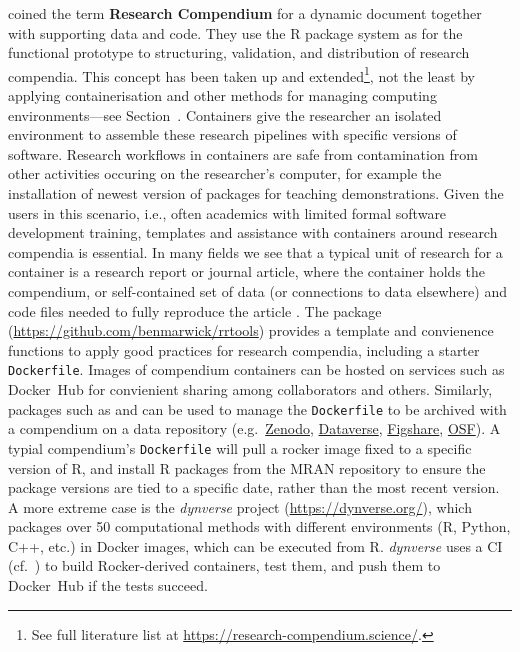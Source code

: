 \citet{gentleman_statistical_2007} coined the term \textbf{Research
Compendium} for a dynamic document together with supporting data and
code. They use the R package system \cite{core_writing_1999} as for the
functional prototype to structuring, validation, and distribution of
research compendia. This concept has been taken up and
extended\footnote{See full literature list at \href{https://research-compendium.science/}{https://research-compendium.science/}.},
not the least by applying containerisation and other methods for
managing computing environments---see Section~. Containers
give the researcher an isolated environment to assemble these research
pipelines with specific versions of software. Research workflows in
containers are safe from contamination from other activities occuring on
the researcher's computer, for example the installation of newest
version of packages for teaching demonstrations. Given the users in this
scenario, i.e., often academics with limited formal software development
training, templates and assistance with containers around research
compendia is essential. In many fields we see that a typical unit of
research for a container is a research report or journal article, where
the container holds the compendium, or self-contained set of data (or
connections to data elsewhere) and code files needed to fully reproduce
the article \citep{marwick_packaging_2018}. The package 
(\url{https://github.com/benmarwick/rrtools}) provides a template and
convienence functions to apply good practices for research compendia,
including a starter \texttt{Dockerfile}. Images of compendium containers
can be hosted on services such as Docker~Hub for convienient sharing
among collaborators and others. Similarly, packages such as
 and  can be used to manage the
\texttt{Dockerfile} to be archived with a compendium on a data
repository (e.g.~\href{https://zenodo.org/}{Zenodo},
\href{https://dataverse.org/}{Dataverse},
\href{https://figshare.com/}{Figshare}, \href{https://osf.io/}{OSF}). A
typial compendium's \texttt{Dockerfile} will pull a rocker image fixed
to a specific version of R, and install R packages from the MRAN
repository to ensure the package versions are tied to a specific date,
rather than the most recent version. A more extreme case is the
\emph{dynverse} project (\url{https://dynverse.org/}), which packages
over 50 computational methods with different environments (R, Python,
C++, etc.) in Docker images, which can be executed from R.
\emph{dynverse} uses a CI (cf.~) to build Rocker-derived
containers, test them, and push them to Docker~Hub if the tests succeed.

